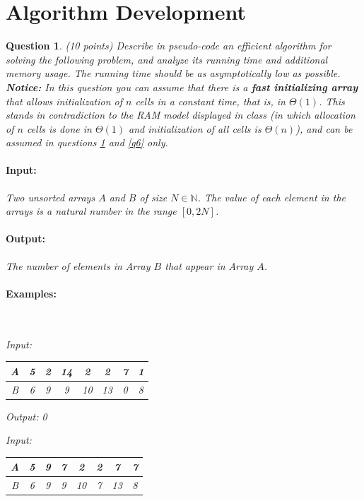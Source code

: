 \documentclass[a4paper]{article}
\theoremstyle{remarksStyle}
\theoremstyle{questionStyle}
\newtheorem{question}{Question}
\theoremstyle{answerStyle}
\begin{document}
\newpage
\section{Algorithm Development}
\begin{question} (10 points)
\label{q5:a}
Describe in pseudo-code an efficient algorithm for solving the following problem, and analyze its running time and additional memory usage. The running time should be as asymptotically low as possible.
\\
\textbf{Notice:} In this question you can assume that there is a \textbf{fast initializing array} that allows initialization of $n$ cells in a constant time, that is, in $\Theta(1)$.
This stands in contradiction to the RAM model displayed in class (in which allocation of $n$ cells is done in $\Theta(1)$ and initialization of all cells is $\Theta(n)$), and can be assumed in questions \ref{q5:a} and \ref{q6} only.
\paragraph{Input:} Two unsorted arrays $A$ and $B$ of size $N\in \mathbb {N}$. The value of each element in the arrays is a natural number in the range $[0,2N]$.
\paragraph{Output:} The number of elements in Array $B$ that appear in Array $A$. 

\paragraph{Examples:} $ $
\vspace{0.5cm}

Input:
\begin{tabular}{|c || c | c  | c | c | c | c | c ||} 
 \hline
 A & 5 & 2 & 14 & 2 & 2 & 7 & 1  \\ 
 \hline
 B & 6 & 9 & 9 & 10 & 13 & 0 & 8\\
 \hline
\end{tabular}

\vspace{0.5cm}
Output: 0


\vspace{1cm}
Input:
\begin{tabular}{|c || c | c  | c | c | c | c | c ||} 
 \hline
 A & 5 & 9 & 7 & 2 & 2 & 7 & 7  \\ 
 \hline
 B & 6 & 9 & 9 & 10 & 7 & 13 & 8\\
 \hline
\end{tabular}


\end{question}
\end{document}
